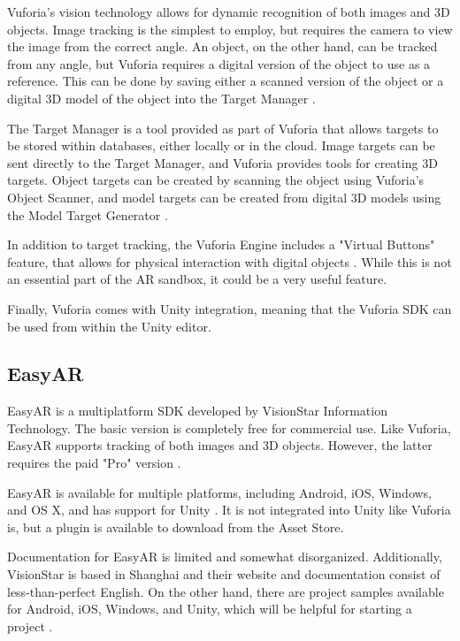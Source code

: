 \documentclass[letterpaper, 10pt, onecolumn, draftclsnofoot]{IEEEtran}
\begin{document}
Vuforia's vision technology allows for dynamic recognition of both images and 3D objects. Image tracking is the simplest to employ, but requires the camera to view the image from the correct angle. An object, on the other hand, can be tracked from any angle, but Vuforia requires a digital version of the object to use as a reference. This can be done by saving either a scanned version of the object or a digital 3D model of the object into the Target Manager \cite{vuforia-features}.

The Target Manager is a tool provided as part of Vuforia that allows targets to be stored within databases, either locally or in the cloud. Image targets can be sent directly to the Target Manager, and Vuforia provides tools for creating 3D targets. Object targets can be created by scanning the object using Vuforia's Object Scanner, and model targets can be created from digital 3D models using the Model Target Generator \cite{vuforia-tools}.

In addition to target tracking, the Vuforia Engine includes a "Virtual Buttons" feature, that allows for physical interaction with digital objects \cite{vuforia-features}. While this is not an essential part of the AR sandbox, it could be a very useful feature.

Finally, Vuforia comes with Unity integration, meaning that the Vuforia SDK can be used from within the Unity editor.

\subsection{EasyAR}
EasyAR is a multiplatform SDK developed by VisionStar Information Technology. The basic version is completely free for commercial use. Like Vuforia, EasyAR supports tracking of both images and 3D objects. However, the latter requires the paid "Pro" version \cite{easyar-prices}.

 EasyAR is available for multiple platforms, including Android, iOS, Windows, and OS X, and has support for Unity \cite{easyar-platforms}. It is not integrated into Unity like Vuforia is, but a plugin is available to download from the Asset Store.

Documentation for EasyAR is limited and somewhat disorganized. Additionally, VisionStar is based in Shanghai and their website and documentation consist of less-than-perfect English. On the other hand, there are project samples available for Android, iOS, Windows, and Unity, which will be helpful for starting a project \cite{easyar-docs}.
\end{document}
